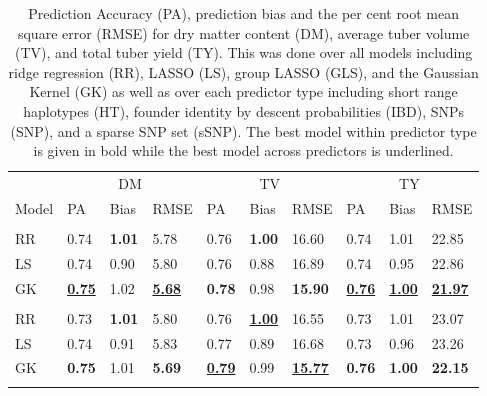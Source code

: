 \hypertarget{tbl-summaries}{}
\begin{table}
\caption{\label{tbl-summaries}Prediction Accuracy (PA), prediction bias and the per cent root mean
square error (RMSE) for dry matter content (DM), average tuber volume
(TV), and total tuber yield (TY). This was done over all models
including ridge regression (RR), LASSO (LS), group LASSO (GLS), and the
Gaussian Kernel (GK) as well as over each predictor type including short
range haplotypes (HT), founder identity by descent probabilities (IBD),
SNPs (SNP), and a sparse SNP set (sSNP). The best model within predictor
type is given in bold while the best model across predictors is
underlined. }\tabularnewline

\centering
\begin{tabular}{llllllllll}
\toprule
\multicolumn{1}{c}{ } & \multicolumn{3}{c}{DM} & \multicolumn{3}{c}{TV} & \multicolumn{3}{c}{TY} \\
\cmidrule(l{3pt}r{3pt}){2-4} \cmidrule(l{3pt}r{3pt}){5-7} \cmidrule(l{3pt}r{3pt}){8-10}
Model & PA & Bias & RMSE & PA & Bias & RMSE & PA & Bias & RMSE\\
\midrule
\addlinespace[0.3em]
\multicolumn{10}{l}{\textbf{SNP}}\\
\hspace{1em}RR & 0.74 & \textbf{1.01} & 5.78 & 0.76 & \textbf{1.00} & 16.60 & 0.74 & 1.01 & 22.85\\
\hspace{1em}LS & 0.74 & 0.90 & 5.80 & 0.76 & 0.88 & 16.89 & 0.74 & 0.95 & 22.86\\
\hspace{1em}GK & \underline{\textbf{0.75}} & 1.02 & \underline{\textbf{5.68}} & \textbf{0.78} & 0.98 & \textbf{15.90} & \underline{\textbf{0.76}} & \underline{\textbf{1.00}} & \underline{\textbf{21.97}}\\
\addlinespace[0.3em]
\multicolumn{10}{l}{\textbf{sSNP}}\\
\hspace{1em}RR & 0.73 & \textbf{1.01} & 5.80 & 0.76 & \underline{\textbf{1.00}} & 16.55 & 0.73 & 1.01 & 23.07\\
\hspace{1em}LS & 0.74 & 0.91 & 5.83 & 0.77 & 0.89 & 16.68 & 0.73 & 0.96 & 23.26\\
\hspace{1em}GK & \textbf{0.75} & 1.01 & \textbf{5.69} & \underline{\textbf{0.79}} & 0.99 & \underline{\textbf{15.77}} & \textbf{0.76} & \textbf{1.00} & \textbf{22.15}\\
\addlinespace[0.3em]

\end{tabular}
\end{table}
